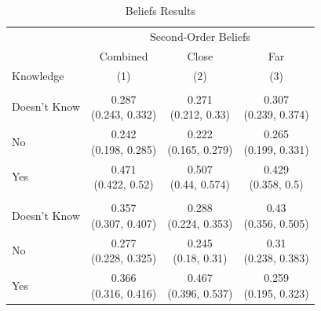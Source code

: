 \documentclass[
]{article}
\begin{document}
\begin{table}
\centering
\caption{\label{tab:unnamed-chunk-13}Beliefs Results}
\centering
\begin{tabular}[t]{lccc}
\toprule
\multicolumn{1}{c}{ } & \multicolumn{3}{c}{Second-Order Beliefs} \\
\cmidrule(l{3pt}r{3pt}){2-4}
\multicolumn{1}{c}{ } & \multicolumn{1}{c}{Combined} & \multicolumn{1}{c}{Close} & \multicolumn{1}{c}{Far} \\
Knowledge & (1) & (2) & (3)\\
\midrule
\addlinespace[0.3em]
\hline
\multicolumn{4}{l}{\textbf{Bracelet}}\\
\hline
\hspace{1em}Doesn't Know & \makecell[c]{0.287\\(0.243, 0.332)} & \makecell[c]{0.271\\(0.212, 0.33)} & \makecell[c]{0.307\\(0.239, 0.374)}\\
\hspace{1em}No & \makecell[c]{0.242\\(0.198, 0.285)} & \makecell[c]{0.222\\(0.165, 0.279)} & \makecell[c]{0.265\\(0.199, 0.331)}\\
\hspace{1em}Yes & \makecell[c]{0.471\\(0.422, 0.52)} & \makecell[c]{0.507\\(0.44, 0.574)} & \makecell[c]{0.429\\(0.358, 0.5)}\\
\addlinespace[0.3em]
\hline
\multicolumn{4}{l}{\textbf{Calendar}}\\
\hline
\hspace{1em}Doesn't Know & \makecell[c]{0.357\\(0.307, 0.407)} & \makecell[c]{0.288\\(0.224, 0.353)} & \makecell[c]{0.43\\(0.356, 0.505)}\\
\hspace{1em}No & \makecell[c]{0.277\\(0.228, 0.325)} & \makecell[c]{0.245\\(0.18, 0.31)} & \makecell[c]{0.31\\(0.238, 0.383)}\\
\hspace{1em}Yes & \makecell[c]{0.366\\(0.316, 0.416)} & \makecell[c]{0.467\\(0.396, 0.537)} & \makecell[c]{0.259\\(0.195, 0.323)}\\

\end{tabular}
\end{table}
\end{document}
